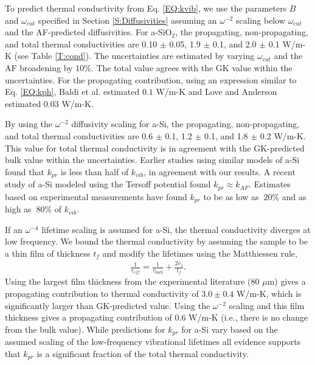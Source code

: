 \documentclass[aps,prb,twocolumn,superscriptaddress,footinbib,amsmath,amssymb,floatfix]{revtex4}
\begin{document}
To predict thermal conductivity from Eq. \eqref{EQ:kvib}, 
we use the parameters $B$ and $\omega_{cut}$ specified 
in Section \ref{S:Diffusivities} assuming an $\omega^{-2}$ 
scaling below $\omega_{cut}$ and the AF-predicted diffusivities. 
For a-SiO$_2$, the propagating, non-propagating, and total thermal 
conductivities are 0.10 $\pm$ 0.05, 1.9 $\pm$ 0.1, 
and 2.0 $\pm$ 0.1 W/m-K (see Table \ref{T:cond}). The uncertainties 
are estimated by varying $\omega_{cut}$ and the AF 
broadening by $10\%$.  
The total value agrees with the GK value within the uncertainties. 
For the propagating contribution, 
using an expression similar to Eq. \eqref{EQ:kph}, 
Baldi et al.\cite{baldi_thermal_2008} estimated $0.1$ W/m-K and 
Love and Anderson\cite{love_estimate_1990} estimated 0.03 W/m-K.

By using the $\omega^{-2}$ diffusivity scaling for a-Si, 
the propagating, non-propagating, and total thermal conductivities 
are 0.6 $\pm$ 0.1, 1.2 $\pm$ 0.1, and 1.8 $\pm$ 0.2 W/m-K. 
This value for total thermal conductivity 
is in agreement with the GK-predicted bulk value within the 
uncertainties. Earlier studies using 
similar models of a-Si found 
that $k_{pr}$ is less than half of 
$k_{vib}$,\cite{feldman_thermal_1993,
feldman_numerical_1999} in agreement with our results.  
A recent study of a-Si modeled using the Tersoff potential found 
$k_{pr} \approx k_{AF}$.\cite{he_heat_2011} 
Estimates based on experimental measurements 
have found $k_{pr}$ to be as low 
as $~20\%$\cite{cahill_thermal_1994,feldman_numerical_1999} 
and as high as $~80\%$ of $k_{vib}$.
\cite{liu_high_2009,yang_anomalously_2010}

If an $\omega^{-4}$ lifetime scaling is assumed for a-Si, 
the thermal conductivity diverges at low frequency. We bound the 
thermal conductivity by assuming the sample to be a thin film 
of thickness $t_f$ and modify the lifetimes using the Matthiessen 
rule,\cite{ziman_electrons_2001} 
\begin{equation}\label{EQ:LambdaMatth}
\begin{split}
\frac{1}{\tau_{eff}} = \frac{1}{\tau_{bulk}} + 
\frac{2v_s}{t_f}.
\end{split}
\end{equation}
Using the largest film thickness from the experimental 
literature ($80$ $\mu$m)\cite{liu_high_2009} 
gives a propagating contribution 
to thermal conductivity of $3.0 \pm 0.4$ W/m-K, which is 
significantly larger than GK-predicted value. 
Using the $\omega^{-2}$ scaling and this film thickness 
gives a propagating contribution of 0.6 W/m-K (i.e., there is 
no change from the bulk value). 
While predictions for $k_{pr}$ for a-Si  
vary based on the assumed scaling of the low-frequency 
vibrational lifetimes 
all evidence supports that $k_{pr}$ is a significant fraction 
of the total thermal conductivity.
\cite{feldman_thermal_1993,cahill_thermal_1994,
feldman_numerical_1999,liu_high_2009,
yang_anomalously_2010,
he_heat_2011,regner_broadband_2013}
\end{document}
